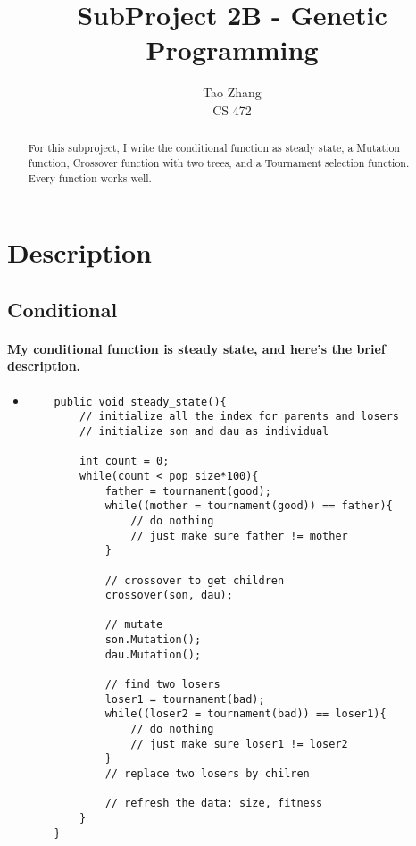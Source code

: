 \documentclass[12pt]{article}
\begin{document}
\title{SubProject 2B - Genetic Programming}

\author{Tao Zhang\\
CS 472}

\maketitle
\newpage


\begin{abstract}
For this subproject, I write the conditional function as steady state, a Mutation function, Crossover function with two trees, and a Tournament selection function. Every function works well.
\end{abstract}

\section{Description}
	\subsection{Conditional}
	\paragraph{My conditional function is steady state, and here's the brief description.}
	\begin{itemize}
	\item
	\begin{lstlisting}
    public void steady_state(){
        // initialize all the index for parents and losers
        // initialize son and dau as individual
        
        int count = 0;
        while(count < pop_size*100){
            father = tournament(good);
            while((mother = tournament(good)) == father){
                // do nothing
                // just make sure father != mother
            }
            
            // crossover to get children
            crossover(son, dau);
                    
            // mutate
            son.Mutation();
            dau.Mutation();
            
            // find two losers
            loser1 = tournament(bad);
            while((loser2 = tournament(bad)) == loser1){
                // do nothing
                // just make sure loser1 != loser2
            }
            // replace two losers by chilren
            
            // refresh the data: size, fitness
        }
    }
	\end{lstlisting}
	\end{itemize}
	
\end{document}
